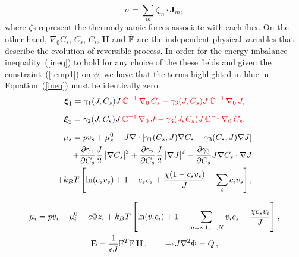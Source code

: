 \begin{equation}
\sigma = \sum_m \zeta_m \cdot \mathbf{J}_m,
\label{dis}
\end{equation}
where $\zeta$s represent the thermodynamic forces associate with each flux. On the other hand, $\nabla_0 \dot{C}_s$, $\dot{C}_s$, $\dot{C}_i$, $\mathbf{\dot{H}}$ and $\dot{\mathbb{F}}$ are the independent physical variables that describe the evolution of reversible process. In order for the energy imbalance inequality~(\ref{ineq}) to hold for any choice of the these fields and given the constraint~(\ref{temp1}) on $\psi$, we have that the terms highlighted in blue in Equation~(\ref{ineq}) must be identically zero. 
\begin{gather}
\boldsymbol{\xi}_1 = \gamma_1(J,C_s) J \,\color{red}{\mathbb{C}^{-1}} \,\nabla_0 \,C_s-\gamma_3(J,C_s) J \,\color{red}{\mathbb{C}^{-1}} \,\nabla_0 \,J,\label{sys1}\\[2mm]
\boldsymbol{\xi}_2 = \gamma_2(J,C_s) J \,\color{red}{\mathbb{C}^{-1}} \,\nabla_0 \,J-\gamma_3(J,C_s) J \,\color{red}{\mathbb{C}^{-1}} \,\nabla_0 \,C_s,\\[2mm]
\begin{aligned}
\mu_s = p v_s + \mu_s^0 -J\nabla\cdot\left[\gamma_1(C_s,J) \nabla C_s- \gamma_3(C_s,J)\nabla J\right] \\
+\frac{\partial \gamma_1}{\partial C_s}\frac{J}{2}\left|\nabla C_s\right|^2+\frac{\partial \gamma_2}{\partial C_s}\frac{J}{2}\left|\nabla J\right|^2-\frac{\partial \gamma_3}{\partial C_s}J\nabla C_s\cdot \nabla J\\
+ k_BT\left[\ln (c_s v_s) +1 -c_sv_s+
 \frac{\chi(1-c_sv_s)}{J}-\sum_i c_iv_s\right], 
\end{aligned}\label{gov1}\\[2.5mm]
\mu_i = p v_i + \mu^0_i + e\Phi z_i + k_BT \left[\ln (v_ic_i)+1-\sum_{m=s,1,\ldots,N}v_ic_s -\frac{\chi c_sv_i}{J} \right],\label{mu}\\
\mathbf{E} = \frac{1}{\epsilon J} \mathbb{F}^T \mathbb{F}\, \mathbf{H}\, , \qquad -\epsilon J \nabla^2 \Phi = Q\, ,\label{sys2}
\end{gather}

